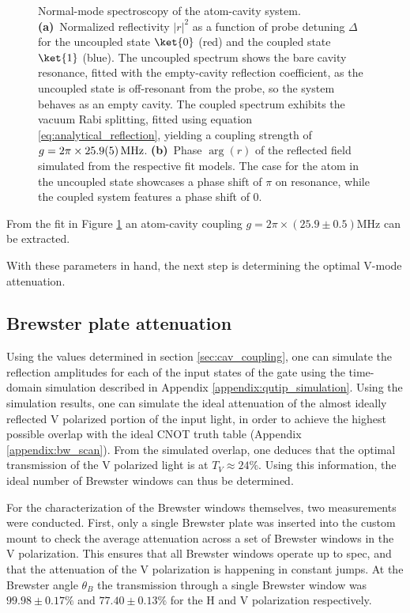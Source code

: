 \begin{figure}[htbp]
	\centering
	
	\caption{Normal-mode spectroscopy of the atom-cavity system. \textbf{(a)}~Normalized reflectivity $|r|^{2}$ as a function of probe detuning $\Delta$ for the uncoupled state $\ket{0}$ (red) and the coupled state $\ket{1}$ (blue). The uncoupled spectrum shows the bare cavity resonance, fitted with the empty-cavity reflection coefficient, as the uncoupled state is off-resonant from the probe, so the system behaves as an empty cavity. The coupled spectrum exhibits the vacuum Rabi splitting, fitted using equation \eqref{eq:analytical_reflection}, yielding a coupling strength of $g = 2\pi \times \SI{25.9\pm0.5}{MHz}$. \textbf{(b)}~Phase $\arg(r)$ of the reflected field simulated from the respective fit models. The case for the atom in the uncoupled state showcases a phase shift of $\pi$ on resonance, while the coupled system features a phase shift of 0.}
	\label{fig:nms_reflection_phase}
\end{figure}

From the fit in Figure \ref{fig:nms_reflection_phase} an atom-cavity coupling $g=2\pi\times (25.9\pm0.5)$MHz can be extracted.

With these parameters in hand, the next step is determining the optimal V-mode attenuation.

\subsection{Brewster plate attenuation} \label{sec:brewster_windows}

Using the values determined in section \ref{sec:cav_coupling}, one can simulate the reflection amplitudes for each of the input states of the gate using the time-domain simulation described in Appendix \ref{appendix:qutip_simulation}. Using the simulation results, one can simulate the ideal attenuation of the almost ideally reflected V polarized portion of the input light, in order to achieve the highest possible overlap with the ideal CNOT truth table (Appendix \ref{appendix:bw_scan}). From the simulated overlap, one deduces that the optimal transmission of the V polarized light is at $T_V\approx24\%$. Using this information, the ideal number of Brewster windows can thus be determined.

For the characterization of the Brewster windows themselves, two measurements were conducted. First, only a single Brewster plate was inserted into the custom mount to check the average attenuation across a set of Brewster windows in the V polarization. This ensures that all Brewster windows operate up to spec, and that the attenuation of the V polarization is happening in constant jumps. At the Brewster angle $\theta_B$ the transmission through a single Brewster window was $99.98\pm0.17\%$ and $77.40\pm0.13\%$ for the H and V polarization respectively.

